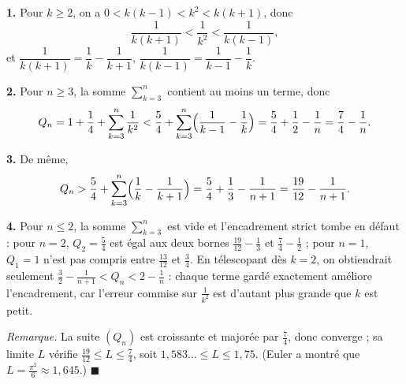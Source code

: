 \textbf{1.} Pour $k \geqslant 2$, on a $0 < k(k-1) < k^2 < k(k+1)$, donc
\[
\frac{1}{k(k+1)} < \frac{1}{k^2} < \frac{1}{k(k-1)},
\]
et $\dfrac{1}{k(k+1)} = \dfrac1k - \dfrac1{k+1}$,
$\dfrac{1}{k(k-1)} = \dfrac{1}{k-1} - \dfrac1k$.

\textbf{2.} Pour $n \geqslant 3$, la somme $\sum_{k=3}^{n}$ contient au
moins un terme, donc
\[
Q_n = 1 + \frac14 + \sum_{k=3}^{n} \frac{1}{k^2}
< \frac54 + \sum_{k=3}^{n} \Bigl(\frac{1}{k-1} - \frac1k\Bigr)
= \frac54 + \frac12 - \frac1n = \frac74 - \frac1n .
\]

\textbf{3.} De même,
\[
Q_n > \frac54 + \sum_{k=3}^{n} \Bigl(\frac1k - \frac{1}{k+1}\Bigr)
= \frac54 + \frac13 - \frac{1}{n+1} = \frac{19}{12} - \frac{1}{n+1}.
\]

\textbf{4.} Pour $n \leqslant 2$, la somme $\sum_{k=3}^{n}$ est vide et
l'encadrement strict tombe en défaut : pour $n = 2$, $Q_2 = \frac54$ est égal
aux deux bornes $\frac{19}{12} - \frac13$ et $\frac74 - \frac12$ ; pour
$n = 1$, $Q_1 = 1$ n'est pas compris entre $\frac{13}{12}$ et $\frac34$. En télescopant dès $k = 2$, on
obtiendrait seulement $\frac32 - \frac{1}{n+1} < Q_n < 2 - \frac1n$ : chaque
terme gardé exactement améliore l'encadrement, car l'erreur commise sur
$\frac{1}{k^2}$ est d'autant plus grande que $k$ est petit.

\emph{Remarque.} La suite $(Q_n)$ est croissante et majorée par $\frac74$,
donc converge ; sa limite $L$ vérifie $\frac{19}{12} \leqslant L \leqslant \frac74$,
soit $1{,}583\ldots \leqslant L \leqslant 1{,}75$. (Euler a montré que
$L = \frac{\pi^2}{6} \approx 1{,}645$.) \hfill $\blacksquare$
